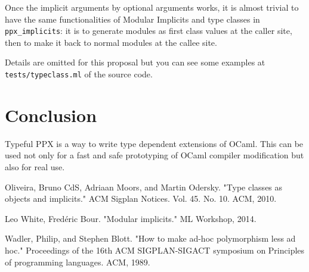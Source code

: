\documentclass{article}
\begin{document}
Once the implicit arguments by optional arguments works, it is almost
trivial to have the same functionalities of Modular Implicits and type
classes in \texttt{ppx\_implicits}: it is to generate modules as first
class values at the caller site, then to make it back to normal modules
at the callee site.

Details are omitted for this proposal but you can see some examples at
\texttt{tests/typeclass.ml} of the source code.

\section{Conclusion}\label{conclusion}

Typeful PPX is a way to write type dependent extensions of OCaml. This
can be used not only for a fast and safe prototyping of OCaml compiler
modification but also for real use.

 
% 

\begin{thebibliography}{9}


  Oliveira, Bruno CdS, Adriaan Moors, and Martin Odersky. "Type classes as objects and implicits." ACM Sigplan Notices. Vol. 45. No. 10. ACM, 2010.

  Leo White, Fred\'eric Bour. "Modular implicits." ML Workshop, 2014.

  Wadler, Philip, and Stephen Blott. "How to make ad-hoc polymorphism less ad hoc." Proceedings of the 16th ACM SIGPLAN-SIGACT symposium on Principles of programming languages. ACM, 1989.

\end{thebibliography}
\end{document}
